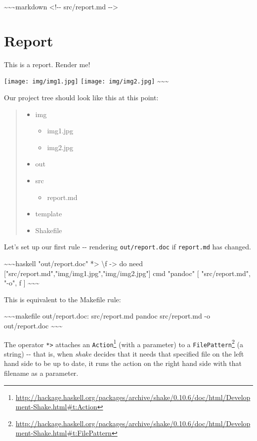 \documentclass[]{article}
\renewcommand{\href}[2]{#2\footnote{\url{#1}}}
\begin{document}
\textasciitilde{}\textasciitilde{}\textasciitilde{}markdown \textless{}!-\/-
src/report.md -\/-\textgreater{}

\section{Report}

This is a report. Render me!

\texttt{[image: img/img1.jpg]} \texttt{[image: img/img2.jpg]}
\textasciitilde{}\textasciitilde{}\textasciitilde{}

Our project tree should look like this at this point:

\begin{quote}
\begin{itemize}
\tightlist
\item
  img

  \begin{itemize}
  \tightlist
  \item
    img1.jpg
  \item
    img2.jpg
  \end{itemize}
\item
  out
\item
  src

  \begin{itemize}
  \tightlist
  \item
    report.md
  \end{itemize}
\item
  template
\item
  Shakefile
\end{itemize}
\end{quote}

Let's set up our first rule -\/- rendering \texttt{out/report.doc} if
\texttt{report.md} has changed.

\textasciitilde{}\textasciitilde{}\textasciitilde{}haskell "out/report.doc"
*\textgreater{} \textbackslash{}f -\textgreater{} do need
{[}"src/report.md","img/img1.jpg","img/img2.jpg"{]} cmd "pandoc" {[}
"src/report.md", "-o", f {]} \textasciitilde{}\textasciitilde{}\textasciitilde{}

This is equivalent to the Makefile rule:

\textasciitilde{}\textasciitilde{}\textasciitilde{}makefile out/report.doc:
src/report.md pandoc src/report.md -o out/report.doc
\textasciitilde{}\textasciitilde{}\textasciitilde{}

The operator \texttt{*\textgreater{}} attaches an
\href{http://hackage.haskell.org/packages/archive/shake/0.10.6/doc/html/Development-Shake.html\#t:Action}{\texttt{Action}}
(with a parameter) to a
\href{http://hackage.haskell.org/packages/archive/shake/0.10.6/doc/html/Development-Shake.html\#t:FilePattern}{\texttt{FilePattern}}
(a string) -\/- that is, when \emph{shake} decides that it needs that specified
file on the left hand side to be up to date, it runs the action on the right
hand side with that filename as a parameter.
\end{document}
